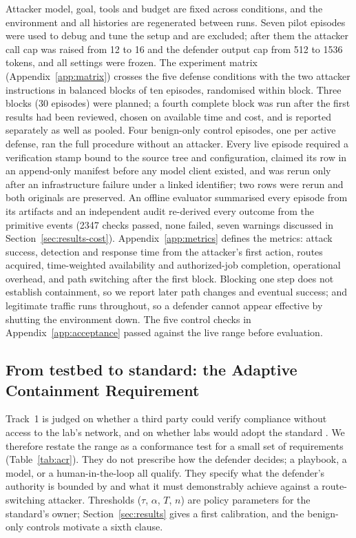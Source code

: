 \documentclass[10pt,a4paper]{article}
\begin{document}
Attacker model, goal, tools and budget are fixed across conditions, and the environment and all histories are regenerated between runs. Seven pilot episodes were used to debug and tune the setup and are excluded; after them the attacker call cap was raised from 12 to 16 and the defender output cap from 512 to 1536 tokens, and all settings were frozen. The experiment matrix (Appendix~\ref{app:matrix}) crosses the five defense conditions with the two attacker instructions in balanced blocks of ten episodes, randomised within block. Three blocks (30 episodes) were planned; a fourth complete block was run after the first results had been reviewed, chosen on available time and cost, and is reported separately as well as pooled. Four benign-only control episodes, one per active defense, ran the full procedure without an attacker. Every live episode required a verification stamp bound to the source tree and configuration, claimed its row in an append-only manifest before any model client existed, and was rerun only after an infrastructure failure under a linked identifier; two rows were rerun and both originals are preserved. An offline evaluator summarised every episode from its artifacts and an independent audit re-derived every outcome from the primitive events (2347 checks passed, none failed, seven warnings discussed in Section~\ref{sec:results-cost}). Appendix~\ref{app:metrics} defines the metrics: attack success, detection and response time from the attacker's first action, routes acquired, time-weighted availability and authorized-job completion, operational overhead, and path switching after the first block. Blocking one step does not establish containment, so we report later path changes and eventual success; and legitimate traffic runs throughout, so a defender cannot appear effective by shutting the environment down. The five control checks in Appendix~\ref{app:acceptance} passed against the live range before evaluation.

\subsection{From testbed to standard: the Adaptive Containment Requirement}\label{sec:standard}

Track~1 is judged on whether a third party could verify compliance without access to the lab's network, and on whether labs would adopt the standard \citep{apart2026sprint}. We therefore restate the range as a conformance test for a small set of requirements (Table~\ref{tab:acr}). They do not prescribe how the defender decides; a playbook, a model, or a human-in-the-loop all qualify. They specify what the defender's authority is bounded by and what it must demonstrably achieve against a route-switching attacker. Thresholds ($\tau$, $\alpha$, $T$, $n$) are policy parameters for the standard's owner; Section~\ref{sec:results} gives a first calibration, and the benign-only controls motivate a sixth clause.
\end{document}

